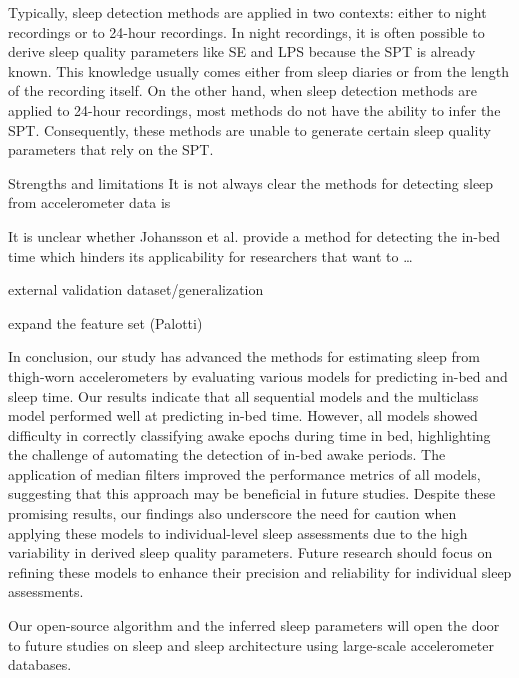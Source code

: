\documentclass[
  super,
  preprint,
  3p]{elsarticle}
\begin{document}
Typically, sleep detection methods are applied in two contexts: either
to night recordings or to 24-hour recordings. In night recordings, it is
often possible to derive sleep quality parameters like SE and LPS
because the SPT is already known. This knowledge usually comes either
from sleep diaries\citep{girschik2012} or from the length of the
recording itself. On the other hand, when sleep detection methods are
applied to 24-hour recordings, most methods do not have the ability to
infer the SPT. Consequently, these methods are unable to generate
certain sleep quality parameters that rely on the
SPT\citep{doherty2017, anderson2014}.

Strengths and limitations It is not always clear the methods for
detecting sleep from accelerometer data is

It is unclear whether Johansson et al.\citep{johansson_development_2023}
provide a method for detecting the in-bed time which hinders its
applicability for researchers that want to \ldots{}

external validation dataset/generalization

expand the feature set (Palotti)

In conclusion, our study has advanced the methods for estimating sleep
from thigh-worn accelerometers by evaluating various models for
predicting in-bed and sleep time. Our results indicate that all
sequential models and the multiclass model performed well at predicting
in-bed time. However, all models showed difficulty in correctly
classifying awake epochs during time in bed, highlighting the challenge
of automating the detection of in-bed awake periods. The application of
median filters improved the performance metrics of all models,
suggesting that this approach may be beneficial in future studies.
Despite these promising results, our findings also underscore the need
for caution when applying these models to individual-level sleep
assessments due to the high variability in derived sleep quality
parameters. Future research should focus on refining these models to
enhance their precision and reliability for individual sleep
assessments.

Our open-source algorithm and the inferred sleep parameters will open
the door to future studies on sleep and sleep architecture using
large-scale accelerometer databases.

\newpage


\renewcommand\refname{References}
  
\end{document}
